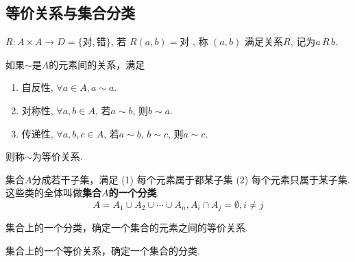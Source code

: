 
\subsection{等价关系与集合分类}

\begin{Definition}[关系\mbox{[Relation]}]
$R: A \times A \rightarrow D = \{\text{对}, \text{错}\} $, 
若
$R(a, b) = \text{对}$
, 称
$(a, b)$
满足关系$R$, 记为$a \, R \, b$.
\end{Definition}

\begin{Definition}[等价关系]
如果$\sim$是$A$的元素间的关系，满足 
\begin{enumerate}[(1)]
\item 自反性, $\forall a \in A, a \sim a$.
\item 对称性, $\forall a, b \in A$, 若$a \sim b$, 则$b \sim a$.
\item 传递性, $\forall a, b, c \in A$, 若$a \sim b$, $b\sim c$, 则$a \sim c$.
\end{enumerate}
则称$\sim$为等价关系.
\end{Definition}

\begin{Definition}[集合分类、划分]
集合$A$分成若干子集，满足 (1) 每个元素属于都某子集 (2) 每个元素只属于某子集. 这些类的全体叫做\textbf{集合$A$的一个分类}.
$$ A = A_1 \cup A_2 \cup \cdots \cup A_n, A_i \cap A_j = \emptyset, i \neq j$$
\end{Definition}

\begin{Theorem}
集合上的一个分类，确定一个集合的元素之间的等价关系.
\end{Theorem}

\begin{Theorem}
集合上的一个等价关系，确定一个集合的分类.
\end{Theorem}

\begin{Definition}
{}
\end{Definition}
